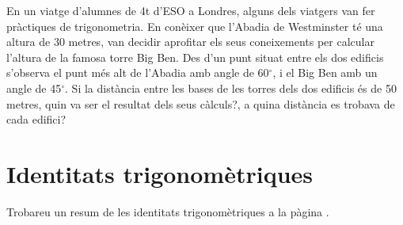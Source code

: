 \begin{mylist}
	\exer
	En un viatge d'alumnes de 4t d'ESO a Londres, alguns dels viatgers
	van fer pràctiques de trigonometria. En conèixer que
	l'Abadia de Westminster té una altura de 30 metres, van decidir
	aprofitar els seus coneixements per calcular l'altura de la famosa
	torre Big Ben. Des d'un punt situat entre els dos edificis
	s'observa el punt més alt de l'Abadia amb angle de 60$^\circ$, i el Big Ben
	amb un angle de 45$^\circ$. Si la distància entre les bases de les torres
	dels dos edificis és de 50 metres, quin va ser el resultat dels seus
	càlculs?, a quina distància es trobava de cada edifici?
	
\end{mylist}

\section{Identitats trigonomètriques}

\begin{theorybox}{Trobareu un resum de les identitats trigonomètriques a la pàgina \pageref{sec:formularitrig}.}
	\vspace{0.4cm}
	
	\begin{minipage}{0.25\textwidth}	
		\centering
		
	\end{minipage}
	\begin{minipage}{0.25\textwidth}
		\centering
		
	\end{minipage}
	\begin{minipage}{0.25\textwidth}
		\centering
		
	\end{minipage}
	\begin{minipage}{0.25\textwidth}
		\centering
		
	\end{minipage}
	
	\vspace{0.5cm}
\end{theorybox}

